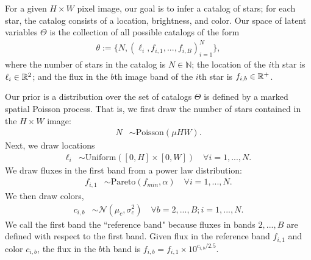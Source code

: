 For a given $H \times W$ pixel image, our goal is to infer a catalog of 
stars; for each star, the catalog consists of a location, brightness, and color. Our space of latent variables 
$\Theta$ is the collection of all possible catalogs of the form
\begin{align}
    \theta := \{N, (\ell_i, f_{i,1}, ..., f_{i,B})_{i = 1}^N\},
    \label{eq:cat_formulation}
\end{align}
where the number of stars in the catalog
is $N\in\mathbb{N}$;
the location of the $i$th star is $\ell_i \in \mathbb{R}^2$;
and the flux in the $b$th image band of the $i$th star is $f_{i, b}\in\mathbb{R}^+$. 

Our prior is a distribution over the set of catalogs $\Theta$ is defined by a marked spatial Poisson process. That is, we first draw the number of stars contained in the $H\times W$ image:
\begin{align}
	N &\sim \text{Poisson}(\mu HW).
\end{align}
Next, we draw locations
\begin{align}
  \ell_{i} &\sim \text{Uniform}([0, H] \times [0, W]) \quad \forall i = 1, ..., N. 
 \end{align}
We draw fluxes in the first band from a power law distribution:
\begin{align}
    f_{i, 1} & \sim \text{Pareto}(f_{min}, \alpha) \quad \forall i = 1, ..., N. 
\label{eq:flux_prior}
\end{align}
We then draw colors,
\begin{align}
  c_{i, b}  & \sim \mathcal{N}(\mu_c, \sigma^2_c) \quad \forall b = 2, ..., B; i = 1, ..., N.
\end{align}
We call the first band the ``reference band" because fluxes in bands $2, ..., B$ are defined with respect to the first band. Given flux in the reference band $f_{i,1}$ and color $c_{i,b}$,
the flux in the $b$th band is  $f_{i,b} = f_{i,1} \times 10^{c_{i,b} / 2.5}$.

